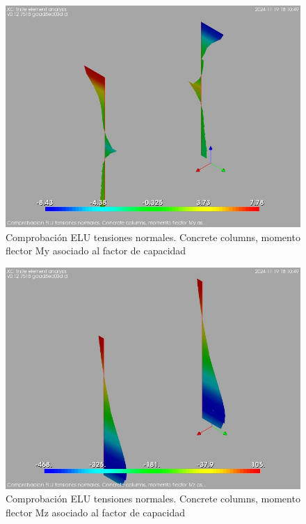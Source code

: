 \begin{figure}[ht]
\begin{center}
\includegraphics[width=\linewidth]{results/graphics/normStrsULS/columnZconcrMy}
\caption{Comprobación ELU tensiones normales. Concrete columns, momento flector My asociado al factor de capacidad}
\label{ULS_normalStressesResistancecolumnZconcrMy}
\end{center}
\end{figure}
\begin{figure}[ht]
\begin{center}
\includegraphics[width=\linewidth]{results/graphics/normStrsULS/columnZconcrMz}
\caption{Comprobación ELU tensiones normales. Concrete columns, momento flector Mz asociado al factor de capacidad}
\label{ULS_normalStressesResistancecolumnZconcrMz}
\end{center}
\end{figure}
